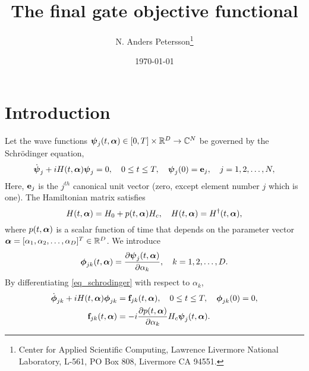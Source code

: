 \documentclass[11pt]{article}
\begin{document}
\title{The final gate objective functional}
\author{N. Anders Petersson\thanks{Center for Applied
     Scientific Computing, Lawrence Livermore National Laboratory, L-561, PO Box 808, Livermore CA
     94551. }}

\date{\today}

\maketitle
\section{Introduction}

Let the wave functions $\boldsymbol{\psi}_j(t,\boldsymbol{\alpha})\in [0, T]\times \mathbb{R}^D \to \mathbb C^N$ be governed by the Schr\"odinger equation,
\begin{equation}\label{eq_schrodinger}
\dot{\boldsymbol{\psi}}_j + iH(t,\boldsymbol{\alpha})\boldsymbol{\psi}_j=0,\quad 0\leq t\leq T, \quad \boldsymbol{\psi}_j(0)={\mathbf e}_j,\quad j=1,2,\ldots,N,
\end{equation}
Here, ${\mathbf e}_j$ is the $j^{th}$ canonical unit vector (zero, except element number $j$ which is
one). The Hamiltonian matrix satisfies
\[
H(t,\boldsymbol{\alpha}) = H_0 + p(t,\boldsymbol{\alpha})H_c,\quad H(t,\boldsymbol{\alpha}) = H^\dag(t,\boldsymbol{\alpha}),
\]
where $p(t,\boldsymbol{\alpha})$ is a scalar function of time that depends on the parameter vector
$\boldsymbol{\alpha}=[\alpha_1,\alpha_2,\ldots,\alpha_D]^T\in \mathbb R^D$. We introduce
\[
\boldsymbol{\phi}_{jk}(t,\boldsymbol{\alpha}) = \frac{\partial \boldsymbol{\psi}_j (t,\boldsymbol{\alpha})}{\partial \alpha_k},\quad k=1,2,\ldots,D.
\]
By differentiating \eqref{eq_schrodinger} with respect to $\alpha_k$,
\begin{align}
\dot{\phib}_{jk} + iH(t,\alphab)\phib_{jk}&=\fb_{jk}(t,\alphab),\quad 0\leq t\leq T, \quad
\phib_{jk}(0)=0,\label{eq_pert_schrodinger}\\
%
\fb_{jk}(t,\alphab) &= -i \frac{\p p(t,\alphab)}{\p \alpha_k} H_c \psib_j(t,\alphab).\label{eq_pert_force}
\end{align}
\end{document}
